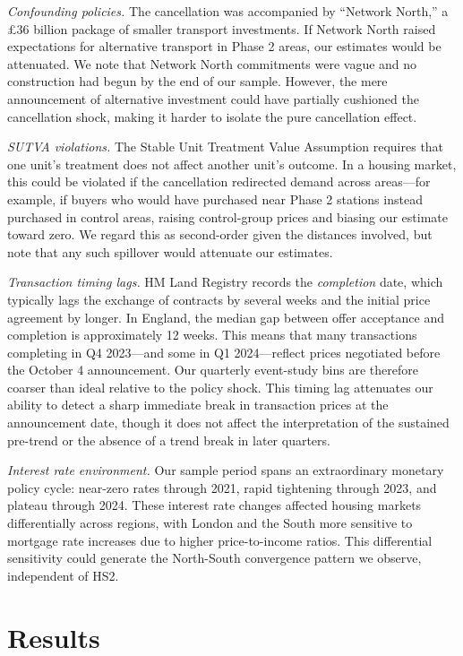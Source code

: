 \documentclass[12pt]{article}
\begin{document}
\textit{Confounding policies.} The cancellation was accompanied by ``Network North,'' a \pounds 36 billion package of smaller transport investments. If Network North raised expectations for alternative transport in Phase 2 areas, our estimates would be attenuated. We note that Network North commitments were vague and no construction had begun by the end of our sample. However, the mere announcement of alternative investment could have partially cushioned the cancellation shock, making it harder to isolate the pure cancellation effect.

\textit{SUTVA violations.} The Stable Unit Treatment Value Assumption requires that one unit's treatment does not affect another unit's outcome. In a housing market, this could be violated if the cancellation redirected demand across areas---for example, if buyers who would have purchased near Phase 2 stations instead purchased in control areas, raising control-group prices and biasing our estimate toward zero. We regard this as second-order given the distances involved, but note that any such spillover would attenuate our estimates.

\textit{Transaction timing lags.} HM Land Registry records the \textit{completion} date, which typically lags the exchange of contracts by several weeks and the initial price agreement by longer. In England, the median gap between offer acceptance and completion is approximately 12 weeks. This means that many transactions completing in Q4 2023---and some in Q1 2024---reflect prices negotiated before the October 4 announcement. Our quarterly event-study bins are therefore coarser than ideal relative to the policy shock. This timing lag attenuates our ability to detect a sharp immediate break in transaction prices at the announcement date, though it does not affect the interpretation of the sustained pre-trend or the absence of a trend break in later quarters.

\textit{Interest rate environment.} Our sample period spans an extraordinary monetary policy cycle: near-zero rates through 2021, rapid tightening through 2023, and plateau through 2024. These interest rate changes affected housing markets differentially across regions, with London and the South more sensitive to mortgage rate increases due to higher price-to-income ratios. This differential sensitivity could generate the North-South convergence pattern we observe, independent of HS2.


\section{Results}
\end{document}
